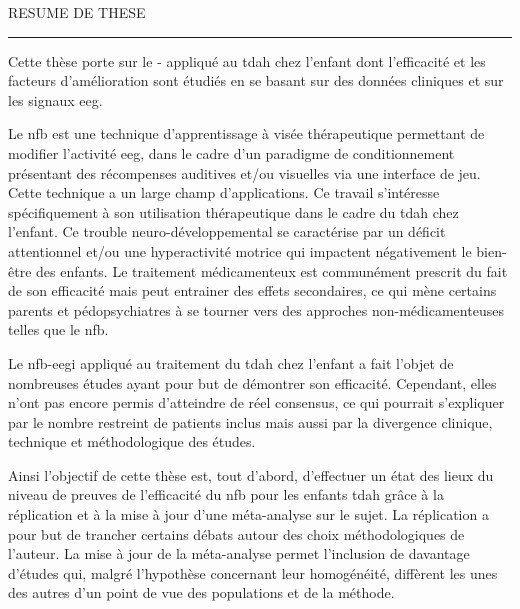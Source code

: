
\begin{center}
\MakeUppercase{\LARGE{R}\Large{esume de these}} \\
\vspace{0mm}
\noindent\rule{16cm}{0.4pt}
\end{center}

Cette thèse porte sur le - appliqué au \gls{tdah} chez l'enfant dont l'efficacité et les 
facteurs d'amélioration sont étudiés en se basant sur des données cliniques et sur les signaux \gls{eeg}. 

Le \gls{nfb} est une technique d'apprentissage à visée thérapeutique permettant de modifier l'activité \gls{eeg}, 
dans le cadre d'un paradigme de conditionnement présentant des récompenses auditives et/ou visuelles via une 
interface de jeu. Cette technique a un large champ d'applications. Ce travail s'intéresse spécifiquement à son utilisation
thérapeutique dans le cadre 
du \gls{tdah} chez l'enfant. Ce trouble neuro-développemental se caractérise par un déficit attentionnel et/ou une hyperactivité 
motrice qui impactent négativement le bien-être des enfants. Le traitement médicamenteux est communément prescrit du fait 
de son efficacité mais peut entrainer des effets secondaires, ce qui mène certains parents et pédopsychiatres à se tourner 
vers des approches non-médicamenteuses telles que le \gls{nfb}.
 
Le \gls{nfb}-\gls{eegi} appliqué au traitement du \gls{tdah} chez l'enfant a fait l'objet de nombreuses études ayant pour but de démontrer son efficacité. 
Cependant, elles n'ont pas encore permis d'atteindre de réel consensus, ce qui pourrait s'expliquer par le nombre restreint de patients inclus 
mais aussi par la divergence clinique, technique et méthodologique des études. 

Ainsi l'objectif de cette thèse est, tout d'abord, d'effectuer un état des lieux du niveau de preuves de l'efficacité 
du \gls{nfb} pour les enfants \gls{tdah} grâce à la réplication et à la mise à jour d'une méta-analyse sur le sujet. 
La réplication a pour but de trancher certains débats autour des choix méthodologiques de l'auteur. 
La mise à jour de la méta-analyse permet l'inclusion de davantage d'études qui, malgré l'hypothèse concernant leur homogénéité,
diffèrent les unes des autres d'un point de vue des populations et de la méthode.  

